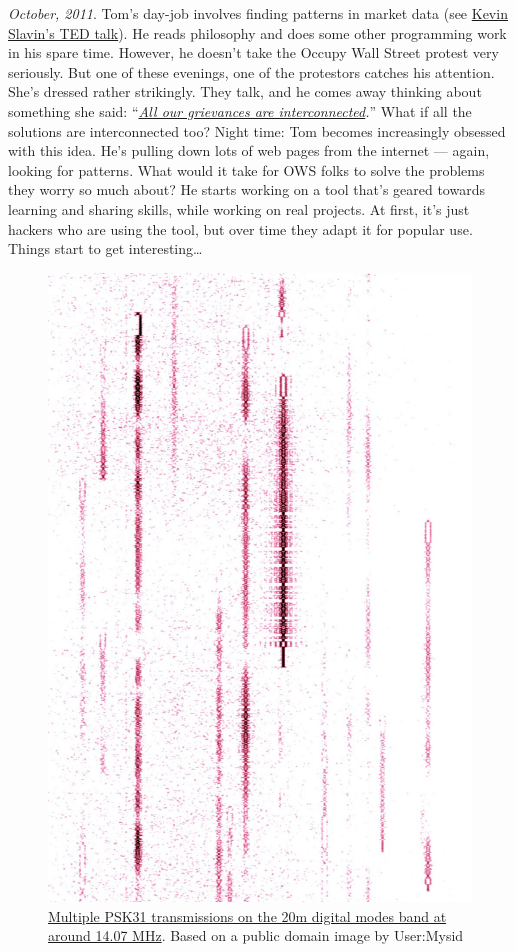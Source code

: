 \emph{October, 2011}. Tom's day-job involves finding patterns in market
data (see
\href{http://www.ted.com/talks/kevin_slavin_how_algorithms_shape_our_world.html}{Kevin
Slavin's TED talk}). He reads philosophy and does some other programming
work in his spare time. However, he doesn't take the Occupy Wall Street
protest very seriously. But one of these evenings, one of the protestors
catches his attention. She's dressed rather strikingly. They talk, and
he comes away thinking about something she said:
``\emph{\href{http://www.nycga.net/files/2011/11/DeclarationFlowchart\_v2\_large.jpg}{All our grievances are interconnected}.}'' What if all the solutions are
interconnected too? Night time: Tom becomes increasingly obsessed with
this idea. He's pulling down lots of web pages from the internet ---
again, looking for patterns. What would it take for OWS folks to solve
the problems they worry so much about? He starts working on a tool
that's geared towards learning and sharing skills, while working on real
projects. At first, it's just hackers who are using the tool, but over
time they adapt it for popular use. Things start to get
interesting\ldots{} 

\begin{figure}[htbp]
\centering
\includegraphics[width=.8\textwidth]{../pictures/matrix-inverted.jpg}
\caption*{\href{https://commons.wikimedia.org/wiki/File:PSK\_matrix.jpg}{Multiple PSK31 transmissions on the 20m digital modes band at around 14.07 MHz}.  Based on a public domain image by User:Mysid}
\end{figure}
